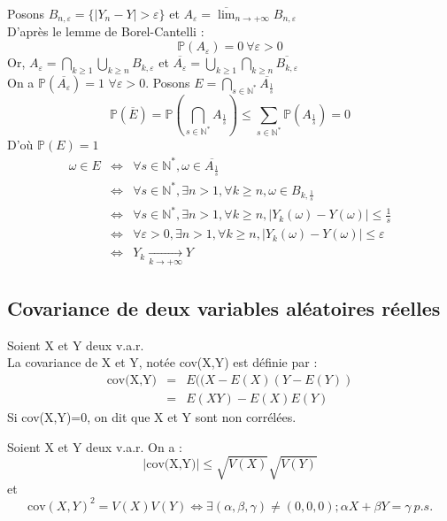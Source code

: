 \begin{dem}
Posons $B_{n,\varepsilon}=\{|Y_n-Y|>\varepsilon\}$ et $A_{\varepsilon}=\overline{\lim}_{n\to +\infty}B_{n,\varepsilon}$ \\
D'après le lemme de Borel-Cantelli : \[\mathbb{P}(A_{\varepsilon})=0\ \forall\varepsilon>0\]
Or, $A_{\varepsilon}=\bigcap_{k\geq 1} \bigcup_{k\geq n} B_{k,\varepsilon}$ et $\overline{A_{\varepsilon}}=\bigcup_{k\geq 1} \bigcap_{k\geq n} \overline{B_{k,\varepsilon}}$ \\
On a $\mathbb{P}(\overline{A_{\varepsilon}})=1$ $\forall \varepsilon>0$. Posons $E=\bigcap_{s\in\mathbb{N}^*} \overline{A_{\frac{1}{s}}}$ 
\[\mathbb{P}(\overline{E})=\mathbb{P}(\bigcap_{s\in\mathbb{N}^*} A_{\frac{1}{s}}) \leq \sum_{s\in\mathbb{N}^*} \mathbb{P}(A_{\frac{1}{s}})=0\]
D'où $\mathbb{P}(E)=1$
\begin{eqnarray*}
\omega\in E &\Leftrightarrow& \forall s\in \mathbb{N}^*, \omega \in \overline{A_{\frac{1}{s}}} \\
&\Leftrightarrow& \forall s\in \mathbb{N}^*, \exists n>1, \forall k\geq n, \omega \in B_{k,\frac{1}{s}} \\
&\Leftrightarrow& \forall s\in \mathbb{N}^*, \exists n>1, \forall k\geq n, |Y_k(\omega)-Y(\omega)|\leq \frac{1}{s} \\
&\Leftrightarrow& \forall \varepsilon>0, \exists n>1, \forall k\geq n, |Y_k(\omega)-Y(\omega)|\leq \varepsilon \\
&\Leftrightarrow& Y_k \xrightarrow[k\to +\infty]{} Y
\end{eqnarray*}
\end{dem}

\subsection{Covariance de deux variables aléatoires réelles}
\begin{Def}
Soient X et Y deux v.a.r. \\
La covariance de X et Y, notée cov(X,Y) est définie par : \begin{eqnarray*}
\text{cov(X,Y)}&=&E((X-E(X)(Y-E(Y)) \\
&=& E(XY)-E(X)E(Y)
\end{eqnarray*}
Si cov(X,Y)=0, on dit que X et Y sont non corrélées. 
\end{Def}

\begin{theo}
Soient X et Y deux v.a.r. On a : \[|\text{cov(X,Y)}|\leq \sqrt{V(X)}\sqrt{V(Y)}\]
et \[\text{cov}(X,Y)^2=V(X)V(Y) \Leftrightarrow \exists(\alpha,\beta,\gamma)\neq(0,0,0); \alpha X+\beta Y= \gamma\ p.s.\]
\end{theo}


